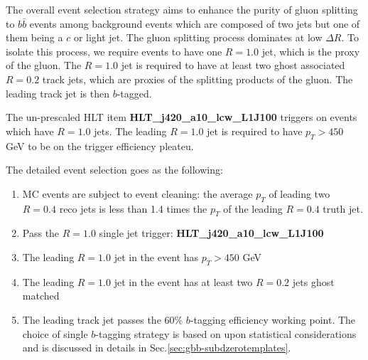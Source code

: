 \label{sec:gbb-eventselection}

The overall event selection strategy aims to enhance the purity of gluon splitting to $b \bar b$ events among background events which are composed of two jets but one of them being a $c$ or light jet. The gluon splitting process dominates at low $\Delta R$. To isolate this process, we require events to have one $R=1.0$ jet, which is the proxy of the gluon. The $R=1.0$ jet is required to have at least two ghost associated $R=0.2$ track jets, which are proxies of the splitting products of the gluon. The leading track jet is then $b$-tagged. 

The un-prescaled HLT item \textbf{HLT\_j420\_a10\_lcw\_L1J100} triggers on events which have $R=1.0$ jets. The leading $R=1.0$ jet is required to have $p_T>450$ GeV to be on the trigger efficiency pleateu. 

The detailed event selection goes as the following:
\begin{enumerate}
	\item MC events are subject to event cleaning: the average $p_T$ of leading two $R=0.4$ reco jets is less than 1.4 times the $p_T$ of the leading $R=0.4$ truth jet. 
	\item Pass the $R=1.0$ single jet trigger: \textbf{HLT\_j420\_a10\_lcw\_L1J100}
	\item The leading $R=1.0$ jet in the event has $p_T>450$ GeV
        \item The leading $R=1.0$ jet in the event has at least two $R=0.2$ jets ghost matched
	\item The leading track jet passes the 60\% $b$-tagging efficiency working point. The choice of single $b$-tagging strategy is based on upon statistical considerations and is discussed in details in Sec.\ref{sec:gbb-subdzerotemplates}.
\end{enumerate}
